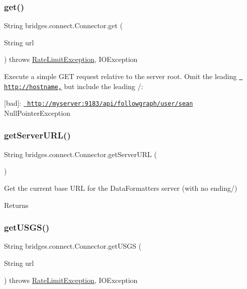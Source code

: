 \subsubsection{\texorpdfstring{get()}{get()}}
{\footnotesize\ttfamily String bridges.\+connect.\+Connector.\+get (\begin{DoxyParamCaption}\item[{String}]{url }\end{DoxyParamCaption}) throws \mbox{\hyperlink{classbridges_1_1validation_1_1_rate_limit_exception}{Rate\+Limit\+Exception}}, I\+O\+Exception}

Execute a simple G\+ET request relative to the server root. Omit the leading \href{http://hostname,}{\texttt{ http\+://hostname,}} but include the leading /\+:

\mbox{[}bad\mbox{]}\+: \href{http://myserver:9183/api/followgraph/user/sean}{\texttt{ http\+://myserver\+:9183/api/followgraph/user/sean}} Null\+Pointer\+Exception \mbox{\label{classbridges_1_1connect_1_1_connector_a0b9809180aac96a83e31e224ab5ed6ec}} 
\subsubsection{\texorpdfstring{getServerURL()}{getServerURL()}}
{\footnotesize\ttfamily String bridges.\+connect.\+Connector.\+get\+Server\+U\+RL (\begin{DoxyParamCaption}{ }\end{DoxyParamCaption})}

Get the current base U\+RL for the Data\+Formatters server (with no ending/) \begin{DoxyReturn}{Returns}

\end{DoxyReturn}
\mbox{\label{classbridges_1_1connect_1_1_connector_a1781405c9b38c338bce042bf7ff23eaf}} 
\subsubsection{\texorpdfstring{getUSGS()}{getUSGS()}}
{\footnotesize\ttfamily String bridges.\+connect.\+Connector.\+get\+U\+S\+GS (\begin{DoxyParamCaption}\item[{String}]{url }\end{DoxyParamCaption}) throws \mbox{\hyperlink{classbridges_1_1validation_1_1_rate_limit_exception}{Rate\+Limit\+Exception}}, I\+O\+Exception}

